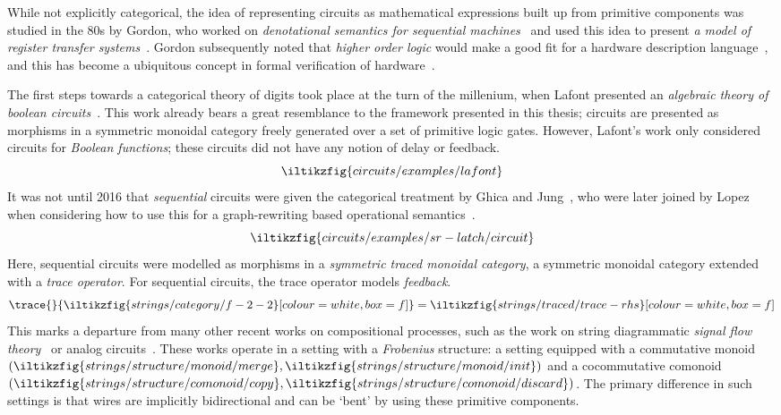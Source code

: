 While not explicitly categorical, the idea of representing circuits as
mathematical expressions built up from primitive components was studied in the
80s by Gordon, who worked on
\emph{denotational semantics for sequential machines}~\cite{gordon1980denotational}
and used this idea to present
\emph{a model of register transfer systems}~\cite{gordon1982model}.
Gordon subsequently noted that \emph{higher order logic} would make a good fit
for a hardware description language~\cite{gordon1985why}, and this has become
a ubiquitous concept in formal verification of hardware~\cite{gupta1992formal}.

The first steps towards a categorical theory of digits took place at the turn of
the millenium, when Lafont presented an
\emph{algebraic theory of boolean circuits}~\cite{lafont2003algebraic}.
This work already bears a great resemblance to the framework presented in this
thesis; circuits
are presented as morphisms in a symmetric monoidal category freely generated
over a set of primitive logic gates.
However, Lafont's work only considered circuits for \emph{Boolean functions};
these circuits did not have any notion of delay or feedback.
\[
    \iltikzfig{circuits/examples/lafont}
\]
It was not until 2016 that \emph{sequential} circuits were given the
categorical treatment by Ghica and Jung~\cite{ghica2016categorical}, who were
later joined by Lopez when considering how to use this for a graph-rewriting
based operational semantics~\cite{ghica2017diagrammatic}.
\[
    \iltikzfig{circuits/examples/sr-latch/circuit}
\]
Here, sequential circuits were modelled as morphisms in a
\emph{symmetric traced monoidal category}, a symmetric monoidal category
extended with a \emph{trace operator}.
For sequential circuits, the trace operator models \emph{feedback}.
\[
    \trace{}{
        \iltikzfig{strings/category/f-2-2}[colour=white,box=f]
    }
    =
    \iltikzfig{strings/traced/trace-rhs}[colour=white,box=f]
\]
This marks a departure from many other recent works on compositional processes,
such as the work on string diagrammatic
\emph{signal flow theory}~\cite{bonchi2021survey} or analog
circuits~\cite{boisseau2022string}.
These works operate in a setting with a \emph{Frobenius} structure: a setting
equipped with a commutative monoid \((
\iltikzfig{strings/structure/monoid/merge},
\iltikzfig{strings/structure/monoid/init}
)\) and a cocommutative comonoid \((
\iltikzfig{strings/structure/comonoid/copy},
\iltikzfig{strings/structure/comonoid/discard}
)\).
The primary difference in such settings is that wires are implicitly
bidirectional and can be `bent' by using these primitive components.
